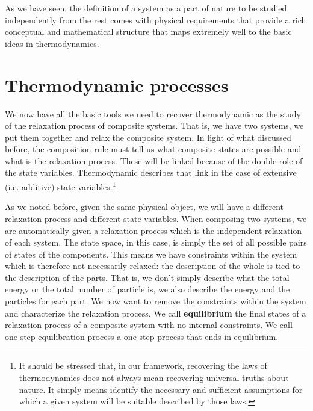 \documentclass[letterpaper]{article}
\begin{document}
As we have seen, the definition of a system as a part of nature to be studied independently from the rest comes with physical requirements that provide a rich conceptual and mathematical structure that maps extremely well to the basic ideas in thermodynamics.

\section{Thermodynamic processes}

We now have all the basic tools we need to recover thermodynamic as the study of the relaxation process of composite systems. That is, we have two systems, we put them together and relax the composite system. In light of what discussed before, the composition rule must tell us what composite states are possible and what is the relaxation process. These will be linked because of the double role of the state variables. Thermodynamic describes that link in the case of extensive (i.e. additive) state variables.\footnote{It should be stressed that, in our framework, recovering the laws of thermodynamics does not always mean recovering universal truths about nature. It simply means identify the necessary and sufficient assumptions for which a given system will be suitable described by those laws.}

As we noted before, given the same physical object, we will have a different relaxation process and different state variables. When composing two systems, we are automatically given a relaxation process which is the independent relaxation of each system. The state space, in this case, is simply the set of all possible pairs of states of the components. This means we have constraints within the system which is therefore not necessarily relaxed: the description of the whole is tied to the description of the parts. That is, we don't simply describe what the total energy or the total number of particle is, we also describe the energy and the particles for each part. We now want to remove the constraints within the system and characterize the relaxation process. We call \textbf{equilibrium} the final states of a relaxation process of a composite system with no internal constraints. We call one-step equilibration process a one step process that ends in equilibrium.
\end{document}
